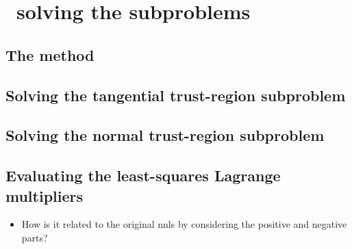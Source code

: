 %
%
%
\chapter{ \textemdash\ solving the subproblems}
\label{ch:cobyqa-subproblems}

\section{The  method}

\section{Solving the tangential trust-region subproblem}

\section{Solving the normal trust-region subproblem}

\section{Evaluating the least-squares Lagrange multipliers}

\begin{itemize}
    \item How is it related to the original \gls{nnls} by considering the positive and negative parts?
\end{itemize}
